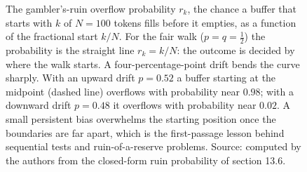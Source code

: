 \begin{figure}[htbp]
\centering
{}
\caption[Gambler's ruin: overflow probability]{The gambler's-ruin
overflow probability $r_k$, the chance a buffer that starts with $k$ of
$N=100$ tokens fills before it empties, as a function of the fractional
start $k/N$. For the fair walk ($p=q=\tfrac12$) the probability is the
straight line $r_k = k/N$: the outcome is decided by where the walk
starts. A four-percentage-point drift bends the curve sharply. With an
upward drift $p=0.52$ a buffer starting at the midpoint (dashed line)
overflows with probability near $0.98$; with a downward drift $p=0.48$
it overflows with probability near $0.02$. A small persistent bias
overwhelms the starting position once the boundaries are far apart,
which is the first-passage lesson behind sequential tests and
ruin-of-a-reserve problems. Source: computed by the authors from the
closed-form ruin probability of section 13.6.}
\label{fig:vol02ch13:gambler-ruin}
\end{figure}
